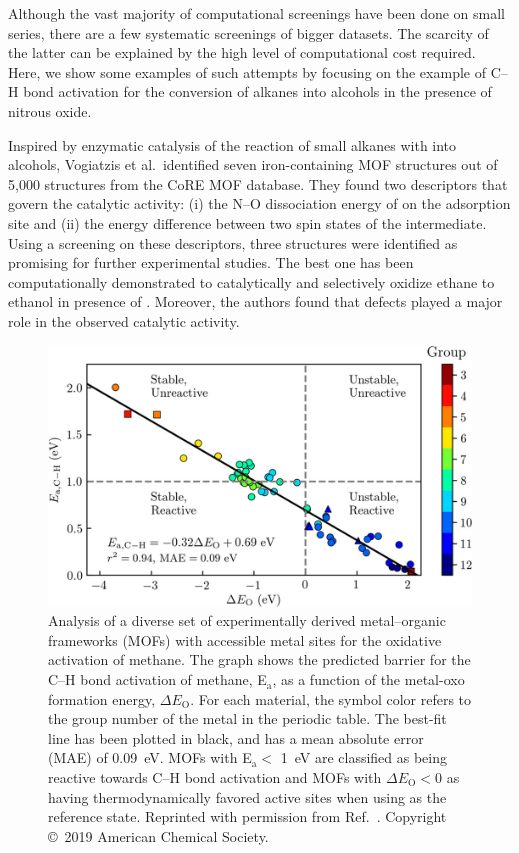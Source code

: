 \documentclass[main.tex]{subfiles}
\begin{document}
Although the vast majority of computational screenings have been done on small series, there are a few systematic screenings of bigger datasets. The scarcity of the latter can be explained by the high level of computational cost required. Here, we show some examples of such attempts by focusing on the example of C--H bond activation for the conversion of alkanes into alcohols in the presence of nitrous oxide.

Inspired by enzymatic catalysis of the reaction of small alkanes with  into alcohols, Vogiatzis et al.\ identified  seven iron-containing MOF structures out of 5,000 structures from the CoRE MOF database.\autocite{Vogiatzis_2016} They found two descriptors that govern the catalytic activity: (i) the N--O dissociation energy of  on the adsorption site and (ii) the energy difference between two spin states of the intermediate.
Using a screening on these descriptors, three structures were identified as promising for further experimental studies. The best one has been computationally demonstrated to catalytically and selectively oxidize ethane to ethanol in presence of . Moreover, the authors found that defects played a major role in the observed catalytic activity.

\begin{figure}[ht]
\centering
  \includegraphics[width=0.8\linewidth]{figures/1-screening/Rosen_2019.jpeg}
  \caption{Analysis of a diverse set of experimentally derived metal--organic frameworks (MOFs) with accessible metal sites for the oxidative activation of methane. The graph shows the predicted barrier for the C--H bond activation of methane, E$_\text{a}$, as a function of the metal-oxo formation energy, $\Delta E_\text{O}$. For each material, the symbol color refers to the group number of the metal in the periodic table. The best-fit line has been plotted in black, and has a mean absolute error (MAE) of \SI{0.09}{\eV}. MOFs with E$_\text{a}<$ \SI{1}{\eV} are classified as being reactive towards C--H bond activation and MOFs with $\Delta E_\text{O}<0$ as having thermodynamically favored active sites when using  as the reference state. Reprinted with permission from Ref.~\cite{Rosen_2019}. Copyright \copyright\  2019 American Chemical Society.}\label{fgr:Rosen_2019}
\end{figure}
\end{document}
